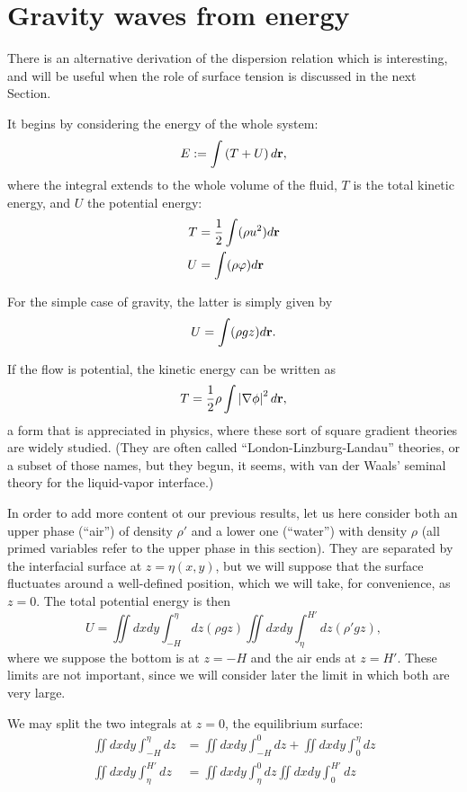 \section{Gravity waves from energy}

There is an alternative derivation of the dispersion relation which is
interesting, and will be useful when the role of surface tension is
discussed in the next Section. \cite{whitham2011linear}

It begins by considering the energy of the whole system:
\[
  E := \int \left( T + U \right) d\mathbf{r} ,
\]
where the integral extends to the whole volume of the fluid, $T$ is
the total kinetic energy, and $U$ the potential energy:
\begin{align}
  T &= \frac12 \int ( \rho u^2 ) d\mathbf{r} \\
  U &=  \int (\rho \varphi) d\mathbf{r} 
\end{align}

For the simple case of gravity, the latter is simply given by
\begin{equation}
  U =    \int ( \rho g z ) d\mathbf{r} .
\end{equation}


If the flow is potential, the kinetic energy can be written as
\begin{equation}
  T = \frac12 \rho \int \left| \nabla\phi \right|^2 d\mathbf{r} ,
\end{equation}
a form that is appreciated in physics, where these sort of square
gradient theories are widely studied. (They are often called
``London-Linzburg-Landau'' theories, or a subset of those names, but
they begun, it seems, with van der Waals' seminal theory for the
liquid-vapor interface.)

In order to add more content ot our previous results, let us here
consider both an upper phase (``air'') of density $\rho'$ and a lower
one (``water'') with density $\rho$ (all primed variables refer to the
upper phase in this section). They are separated by the interfacial
surface at $z=\eta(x,y)$, but we will suppose that the surface
fluctuates around a well-defined position, which we will take, for
convenience, as $z=0$. The total potential energy is then
\[
U=
\iint dx dy   \int_{-H}^\eta  dz  ( \rho g z)
\iint dx dy   \int_\eta^{H'}  dz  ( \rho' g z)  ,
\]
where we suppose the bottom is at $z=-H$ and the air ends at $z=H'$. These
limits are not important, since we will consider later the limit
in which both are very large.

We may split the two integrals at $z=0$, the equilibrium surface:
\begin{align*}
  \iint dx dy   \int_{-H}^\eta  dz   &= 
                                       \iint dx dy   \int_{-H}^0  dz   +
                                       \iint dx dy   \int_{0}^\eta  dz   \\
  \iint dx dy   \int_\eta^{H'}  dz    &=
                                        \iint dx dy   \int_\eta^{0}  dz 
                                        \iint dx dy   \int_0^{H'}  dz  
\end{align*}

